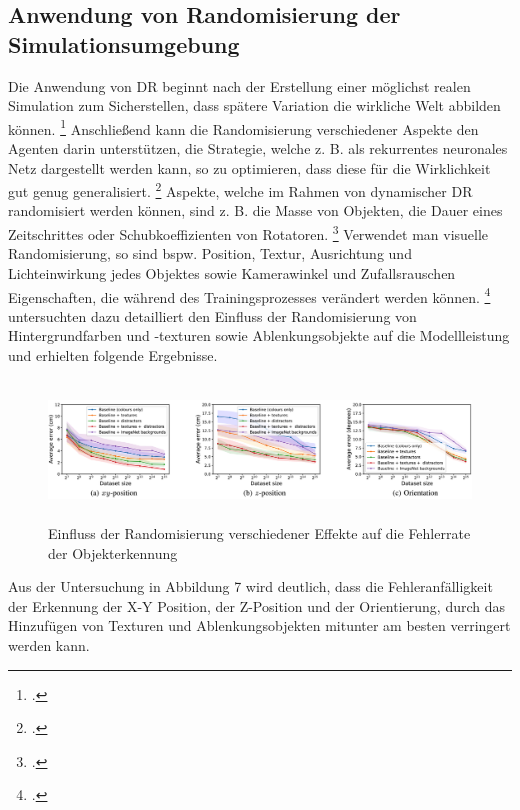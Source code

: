 \subsection{Anwendung von Randomisierung der Simulationsumgebung}

Die Anwendung von DR beginnt nach der Erstellung einer möglichst realen Simulation zum Sicherstellen, dass spätere Variation die wirkliche Welt abbilden können. \footcite[Vgl.][S. 4]{Chen.2021}
Anschließend kann die Randomisierung verschiedener Aspekte den Agenten darin unterstützen, die Strategie, welche z. B. als rekurrentes neuronales Netz dargestellt werden kann, so zu optimieren, dass diese für die Wirklichkeit gut genug generalisiert. \footcite[Vgl.][S. 4]{Chen.2021}
Aspekte, welche im Rahmen von dynamischer DR randomisiert werden können, sind z. B. die Masse von Objekten, die Dauer eines Zeitschrittes oder Schubkoeffizienten von Rotatoren. \footcite[Vgl.][S. 4]{Molchanov.2019}
Verwendet man visuelle Randomisierung, so sind bspw. Position, Textur, Ausrichtung und Lichteinwirkung jedes Objektes sowie Kamerawinkel und Zufallsrauschen Eigenschaften, die während des Trainingsprozesses verändert werden können. \footcite[Vgl.][S. 3]{Tobin.2017}
\cite[]{Alghonaim.5302021652021} untersuchten dazu detailliert den Einfluss der Randomisierung von Hintergrundfarben und -texturen sowie Ablenkungsobjekte auf die Modellleistung und erhielten folgende Ergebnisse.

\begin{figure}[htb]
    \centering
    \includegraphics[height=3.7cm]{lib/graphics/influence_visual_randomness.png}
    \caption[Einfluss der Randomisierung verschiedener Effekte auf die Fehlerrate der Objekterkennung]{Einfluss der Randomisierung verschiedener Effekte auf die Fehlerrate der Objekterkennung\footnotemark}
    \label{abb:visual_randomization}
\end{figure}

Aus der Untersuchung in Abbildung 7 wird deutlich, dass die Fehleranfälligkeit der Erkennung der X-Y Position, der Z-Position und der Orientierung, durch das Hinzufügen von Texturen und Ablenkungsobjekten mitunter am besten verringert werden kann. 

